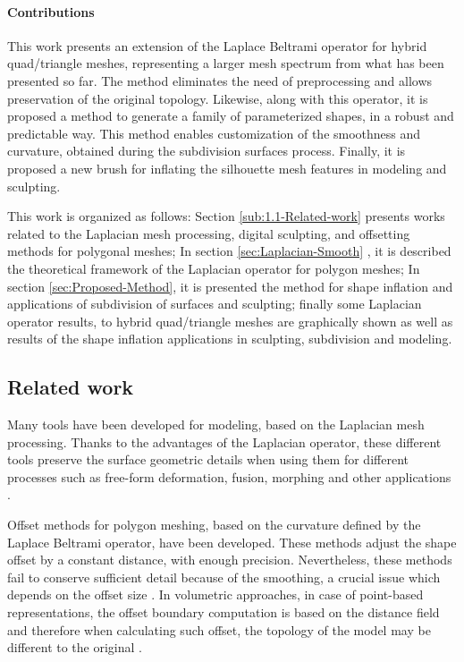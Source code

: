 \documentclass[10pt, conference]{IEEEtran}
\begin{document}
\paragraph*{Contributions}
%
This work presents an extension of the Laplace
Beltrami operator for hybrid quad/triangle meshes, representing a
larger mesh spectrum from what has been presented so far. The method
eliminates the need of preprocessing and allows preservation of the
original topology. Likewise, along with this operator, it is proposed
a method to generate a family of parameterized shapes, in a robust
and predictable way. This method enables customization of the smoothness
and curvature, obtained during the subdivision surfaces process. Finally,
it is proposed a new brush for inflating the silhouette mesh features
in modeling and sculpting.

This work is organized as follows: Section \ref{sub:1.1-Related-work}
presents works related to the Laplacian mesh processing, digital sculpting,
and offsetting methods for polygonal meshes; In section \ref{sec:Laplacian-Smooth}
, it is described the theoretical framework of the Laplacian operator
for polygon meshes; In section \ref{sec:Proposed-Method}, it is presented
the method for shape inflation and applications of subdivision of
surfaces and sculpting; finally some Laplacian operator results, to
hybrid quad/triangle meshes are graphically shown as well as results
of the shape inflation applications in sculpting, subdivision and
modeling.


\subsection{Related work\label{sub:1.1-Related-work}}
%
Many tools have been developed for modeling, based on the Laplacian
mesh processing. Thanks to the advantages of the Laplacian operator,
these different tools preserve the surface geometric details when
using them for different processes such as free-form deformation,
fusion, morphing and other applications \cite{Sorkine2004}. 

Offset methods for polygon meshing, based on the curvature defined
by the Laplace Beltrami operator, have been developed. These methods
adjust the shape offset by a constant distance, with enough precision. Nevertheless, these methods fail
to conserve sufficient detail because of the smoothing, a crucial
issue which depends on the offset size \cite{Zhuo2012}. In volumetric
approaches, in case of point-based representations, the offset boundary
computation is based on the distance field and therefore when calculating
such offset, the topology of the model may be different to the original
\cite{Chen2011}.
\end{document}
